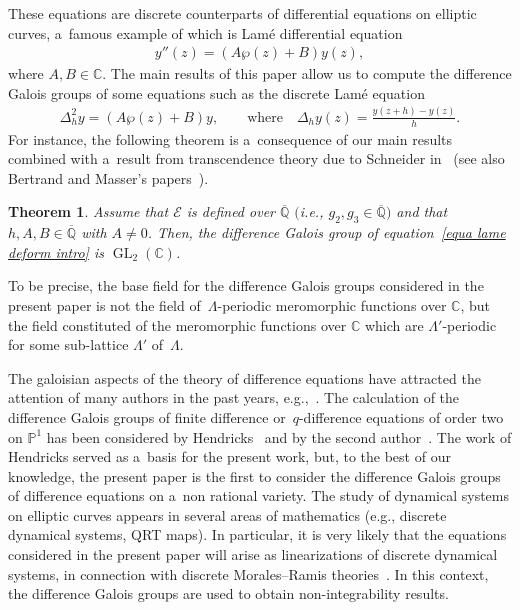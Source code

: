 \documentclass[pdftex]{sigma}
\numberwithin{equation}{section}
\newtheorem*{theointro}{Theorem}
\begin{document}
These equations are discrete counterparts of dif\/ferential equations on elliptic curves, a~famous example of which is
Lam\'e dif\/ferential equation
\begin{gather*}
y''(z) = (A\wp(z)+B)y(z),
\end{gather*}
where $A,B\in \mathbb C$.
The main results of this paper allow us to compute the dif\/ference Galois groups of some equations such as the discrete
Lam\'e equation
\begin{gather}
\label{equa lame deform intro}
\Delta_h^2 y = (A\wp(z)+B)y,\qquad \text{where} \quad \Delta_h y(z) = \frac{y(z+h)-y(z)}{h}.
\end{gather}
For instance, the following theorem is a~consequence of our main results combined with a~result from transcendence
theory due to Schneider in~\cite{schneider} (see also Bertrand and Masser's pa\-pers~\mbox{\cite{BerMas,Mas75}}).

\begin{theointro}
Assume that $\mathcal{E}$ is defined over $\overline{\mathbb{Q}}$ $($i.e., $g_{2},g_{3} \in \overline{\mathbb{Q}})$
and that $h,A,B\in \overline{\mathbb{Q}}$ with $A \neq 0$.
Then, the difference Galois group of equation~\eqref{equa lame deform intro} is $\operatorname{GL}_{2}(\mathbb C)$.
\end{theointro}

To be precise, the base f\/ield for the dif\/ference Galois groups considered in the present paper is not the f\/ield
of~$\Lambda$-periodic meromorphic functions over $\mathbb C$, but the f\/ield constituted of the meromorphic functions
over $\mathbb C$ which are $\Lambda'$-periodic for some sub-lattice $\Lambda'$ of~$\Lambda$.

The galoisian aspects of the theory of dif\/ference equations have attracted the attention of many authors in the past
years,
e.g.,~\cite{andrenoncomm,BuT,chatziharsing,diviziogrothendieck,hardouin-divizioqgrothendieckCRAS,etingofgalois,franke63,franke66,franke67,franke74,
hardouin-singer,NG,OW14,ramissauloyqstokes1,ramissauloyqstokes2,RS14,sauloyqgaloisfuchs,vdpr,VdPS97}.
The calculation of the dif\/ference Galois groups of f\/inite dif\/ference or~$q$-dif\/ference equations of order two on
$\mathbb{P}^{1}$ has been considered by Hendricks~\cite{Hen97,Hen98} and by the second author~\cite{Ro08}.
The work of Hendricks served as a~basis for the present work, but, to the best of our knowledge, the present paper is
the f\/irst to consider the dif\/ference Galois groups of dif\/ference equations on a~non rational variety.
The study of dynamical systems on elliptic curves appears in several areas of mathematics (e.g., discrete dynamical
systems, QRT maps).
In particular, it is very likely that the equations considered in the present paper will arise as linearizations of
discrete dynamical systems, in connection with discrete Morales--Ramis theories~\cite{CasR,casale-roques-2}.
In this context, the dif\/ference Galois groups are used to obtain non-integrability results.
\end{document}
